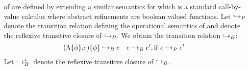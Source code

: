 \begin{comment}
Definition of \erase{\dot}:

\begin{align*}
\erase{x}                      &= x \\
\erase{c}                      &= c\\
\erase{\eapp{e_1}{e_2}}        &= \eapp{\erase{e_1}}{\erase{e_2}}\\
\erase{\etabs{\alpha}{e}}      &= \etabs{\alpha}{\erase{e}}\\
\erase{\etapp{e}{\tau}}        &= \etapp{\erase{e}}{\erase{\tau}}\\
\erase{\epabs{\rvar}{\tau}{e}} &= \epabs{\rvar}{\erase{\tau}}{\erase{e}}\\
\erase{\epapp{e_1}{e_2}}           &= \epapp{\erase{e_1}}{\erase{e_2}}\\
%
\erase{\elet{x}{e_x}{e}{\tau}} &= \elet{x}{\erase{e_x}}{\erase{e}}{\erase{\tau}}\\
%
\erase{\econstraint{\phi}{e}}  &= \erase{e}\\
\erase{\econstantconstraint{e}{\phi}} &= \erase{e}
\end{align*}

\begin{definition}%
$ e\boundedgoestostar{c} \Leftrightarrow {\erase{e}}\goestostar{c} $.
\end{definition}

The below does not hold:
\begin{lemma*}[Operational]%
\label{theorem:operational}
If
   $\vdash_{B} e : \tau$ and
   $\txexpr{\emptyset}{\emptyset}{e}{e'}$
then
   $\erase{e} \goestostar{c} \Leftrightarrow {e'} \goestostar{c} $.
\end{lemma*}

Counterexample e = \{φ} =>  0

\end{comment}

 of \boundedcorelan
are defined by extending a similar semantics for \corelan
which is a standard call-by-value calculus where abstract
refinements are boolean valued functions.
%
Let $\hookrightarrow_P$ denote the transition relation defining
the operational semantics of \corelan and \tclos{\stepcore}
denote the reflexive transitive closure of $\hookrightarrow_P$.
%
We obtain the transition relation $\hookrightarrow_B$:
%
\begin{align*}
 (\Lambda \{\phi \} . e ) \{ \phi \}  &\hookrightarrow_B {e} &
e  & \hookrightarrow_B e', \text{if}\ {e \hookrightarrow_P e'}
\end{align*}
%
Let $\hookrightarrow_B^{\star} {} $ denote the reflexive transitive
closure of $\hookrightarrow_B$.

